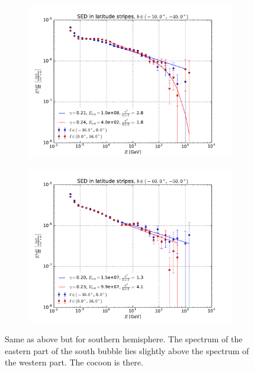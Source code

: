 \documentclass[a4paper]{article}
\begin{document}
\begin{figure}
\begin{subfigure}{0.5\textwidth}
        \includegraphics[width=\textwidth]{spectrum_of_bottom_bubble_in_lat_stripes_40-50.pdf}
    \end{subfigure} 
    \begin{subfigure}{0.5\textwidth}
        \includegraphics[width=\textwidth]{spectrum_of_bottom_bubble_in_lat_stripes_50-60.pdf}
    \end{subfigure}
    \caption{Same as above but for southern hemisphere. The spectrum of the eastern part of the south bubble lies slightly above the spectrum of the western part. The cocoon is there.}
\end{figure}
\end{document}
